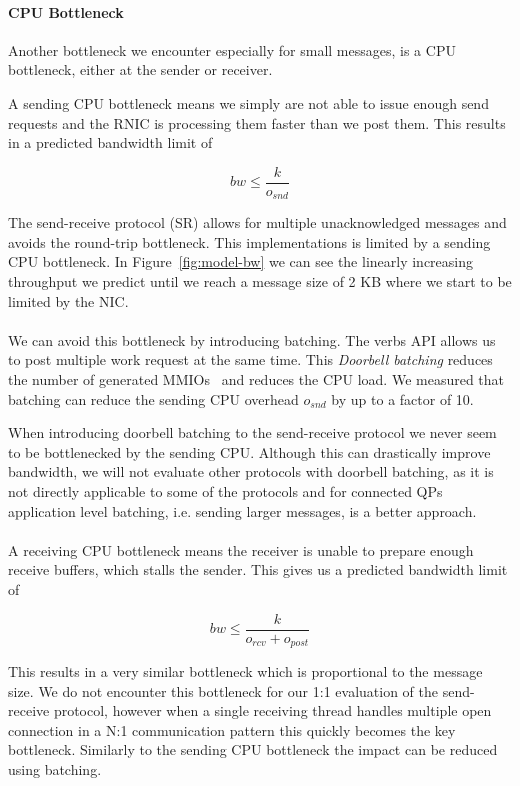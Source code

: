 \paragraph{CPU Bottleneck} Another bottleneck we encounter especially for small messages, is a CPU bottleneck, either at the 
sender or receiver.

A sending CPU bottleneck means we simply are not able to issue enough send requests and the RNIC is processing them faster
than we post them. This results in a predicted bandwidth limit of

$$
bw \leq \frac{k}{o_{snd}}
$$


The send-receive protocol (SR) allows for multiple unacknowledged messages and avoids the round-trip bottleneck. 
This implementations is limited by a sending CPU bottleneck. In Figure~\ref{fig:model-bw} we can see the linearly
increasing throughput we predict until we reach a message size of 2 KB where we start to be limited by the NIC.

\paragraph{} We can avoid this bottleneck by introducing batching. The verbs API allows us to post multiple work request at 
the same time. This \emph{Doorbell batching} reduces the number of generated MMIOs~\cite{anuj-guide} and reduces the CPU 
load. We measured that batching can reduce the sending CPU overhead $o_{snd}$ by up to a factor of 10. 

When introducing doorbell batching to the send-receive protocol we never seem to be bottlenecked by the sending CPU. 
Although this can drastically improve bandwidth, we will not evaluate other protocols with doorbell batching, as it is
not directly applicable to some of the protocols and for connected QPs application level batching, i.e. sending larger 
messages, is a better approach.

\paragraph{} A receiving CPU bottleneck means the receiver is unable to prepare enough receive buffers, 
which stalls the sender. This gives us a predicted bandwidth limit of

$$
bw \leq \frac{k}{o_{rcv} + o_{post}}
$$

This results in a very similar bottleneck which is proportional to the message size. We do not encounter this bottleneck for
our 1:1 evaluation of the send-receive protocol, however when a single receiving thread handles multiple open connection 
in a N:1 communication pattern this quickly becomes the key bottleneck.
Similarly to the sending CPU bottleneck the impact can be reduced using batching.

